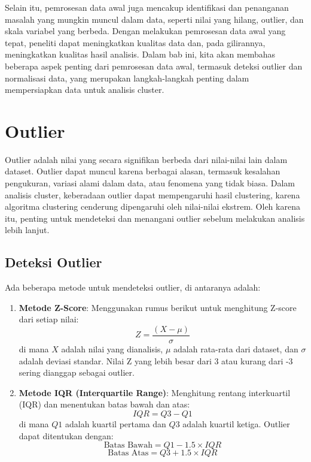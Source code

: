 \documentclass[
  oneside]{book}
\begin{document}
Selain itu, pemrosesan data awal juga mencakup identifikasi dan penanganan masalah yang mungkin muncul dalam data, seperti nilai yang hilang, outlier, dan skala variabel yang berbeda. Dengan melakukan pemrosesan data awal yang tepat, peneliti dapat meningkatkan kualitas data dan, pada gilirannya, meningkatkan kualitas hasil analisis. Dalam bab ini, kita akan membahas beberapa aspek penting dari pemrosesan data awal, termasuk deteksi outlier dan normalisasi data, yang merupakan langkah-langkah penting dalam mempersiapkan data untuk analisis cluster.

\section{Outlier}\label{outlier}

Outlier adalah nilai yang secara signifikan berbeda dari nilai-nilai lain dalam dataset. Outlier dapat muncul karena berbagai alasan, termasuk kesalahan pengukuran, variasi alami dalam data, atau fenomena yang tidak biasa. Dalam analisis cluster, keberadaan outlier dapat mempengaruhi hasil clustering, karena algoritma clustering cenderung dipengaruhi oleh nilai-nilai ekstrem. Oleh karena itu, penting untuk mendeteksi dan menangani outlier sebelum melakukan analisis lebih lanjut.

\subsection{Deteksi Outlier}\label{deteksi-outlier}

Ada beberapa metode untuk mendeteksi outlier, di antaranya adalah:

\begin{enumerate}
\def\labelenumi{\arabic{enumi}.}
\item
  \textbf{Metode Z-Score}: Menggunakan rumus berikut untuk menghitung Z-score dari setiap nilai:
  \[
  Z = \frac{(X - \mu)}{\sigma}
  \]
  di mana \(X\) adalah nilai yang dianalisis, \(\mu\) adalah rata-rata dari dataset, dan \(\sigma\) adalah deviasi standar. Nilai Z yang lebih besar dari 3 atau kurang dari -3 sering dianggap sebagai outlier.
\item
  \textbf{Metode IQR (Interquartile Range)}: Menghitung rentang interkuartil (IQR) dan menentukan batas bawah dan atas:
  \[
  IQR = Q3 - Q1
  \]
  di mana \(Q1\) adalah kuartil pertama dan \(Q3\) adalah kuartil ketiga. Outlier dapat ditentukan dengan:
  \[
  \text{Batas Bawah} = Q1 - 1.5 \times IQR
  \]
  \[
  \text{Batas Atas} = Q3 + 1.5 \times IQR
  \]
\end{enumerate}
\end{document}

